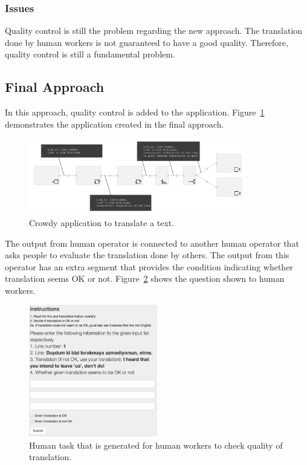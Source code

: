 \subsubsection{Issues}
Quality control is still the problem regarding the new approach. The translation done by human workers is not guaranteed to have a good quality. Therefore, quality control is still a fundamental problem.

\subsection{Final Approach}
In this approach, quality control is added to the application. Figure~\ref{fig:scenario2.2} demonstrates the application created in the final approach.

\begin{figure}[ht]
	\centering
	\includegraphics[width=0.85\textwidth]{figures/scenarios/scenario2_3a.png}
	\caption{Crowdy application to translate a text.}
	\label{fig:scenario2.2}
\end{figure}

The output from human operator is connected to another human operator that asks people to evaluate the translation done by others. The output from this operator has an extra segment that provides the condition indicating whether translation seems OK or not. Figure~\ref{fig:scenario2.2h} shows the question shown to human workers.

\begin{figure}[ht]
	\centering
	\includegraphics[width=0.5\textwidth]{figures/scenarios/scenario2_2h.png}
	\caption{Human task that is generated for human workers to check quality of translation.}
	\label{fig:scenario2.2h}
\end{figure}

